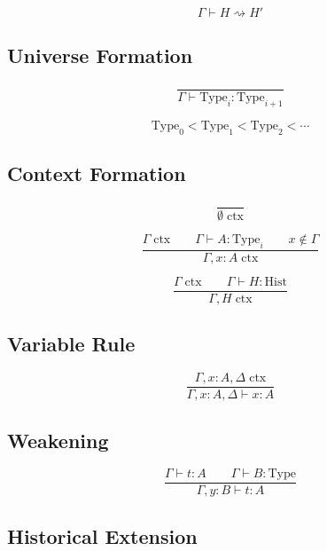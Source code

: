 \documentclass[12pt,oneside]{article}
\theoremstyle{definition}
\theoremstyle{remark}
\begin{document}
\[
\Gamma\vdash H\rightsquigarrow H'
\]

\subsection*{Universe Formation}

\[
\frac{}
{\Gamma\vdash
\mathrm{Type}_i:\mathrm{Type}_{i+1}}
\]

\[
\mathrm{Type}_0
<
\mathrm{Type}_1
<
\mathrm{Type}_2
<
\cdots
\]

\subsection*{Context Formation}

\[
\frac{}
{\emptyset\;\mathrm{ctx}}
\]

\[
\frac
{\Gamma\;\mathrm{ctx}
\qquad
\Gamma\vdash A:\mathrm{Type}_i
\qquad
x\notin\Gamma}
{\Gamma,x:A\;\mathrm{ctx}}
\]

\[
\frac
{\Gamma\;\mathrm{ctx}
\qquad
\Gamma\vdash H:\mathrm{Hist}}
{\Gamma,H\;\mathrm{ctx}}
\]

\subsection*{Variable Rule}

\[
\frac
{\Gamma,x:A,\Delta\;\mathrm{ctx}}
{\Gamma,x:A,\Delta\vdash x:A}
\]

\subsection*{Weakening}

\[
\frac
{\Gamma\vdash t:A
\qquad
\Gamma\vdash B:\mathrm{Type}}
{\Gamma,y:B\vdash t:A}
\]

\subsection*{Historical Extension}
\end{document}
